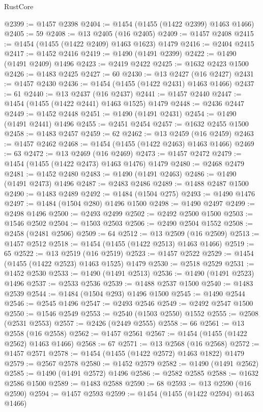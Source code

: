 \begin{lexlean}{RustCore}
\begin{coremodule}
@2399 := @1457 @2398
@2404 := @1454 (@1455 (@1422 @2399) @1463 @1466)
@2405 := 59
@2408 := @13 @2405 (@16 @2405)
@2409 := @1457 @2408
@2415 := @1454 (@1455 (@1422 @2409) @1463 @1623) @1479
@2416 := @2404 @2415
@2417 := @1452 @2416
@2419 := @1490 (@1491 @2399)
@2422 := @1490 (@1491 @2409) @1496
@2423 := @2419 @2422
@2425 := @1632 @2423 @1500
@2426 := @1483 @2425
@2427 := 60
@2430 := @13 @2427 (@16 @2427)
@2431 := @1457 @2430
@2436 := @1454 (@1455 (@1422 @2431) @1463 @1466)
@2437 := 61
@2440 := @13 @2437 (@16 @2437)
@2441 := @1457 @2440
@2447 := @1454 (@1455 (@1422 @2441) @1463 @1525) @1479
@2448 := @2436 @2447
@2449 := @1452 @2448
@2451 := @1490 (@1491 @2431)
@2454 := @1490 (@1491 @2441) @1496
@2455 := @2451 @2454
@2457 := @1632 @2455 @1500
@2458 := @1483 @2457
@2459 := 62
@2462 := @13 @2459 (@16 @2459)
@2463 := @1457 @2462
@2468 := @1454 (@1455 (@1422 @2463) @1463 @1466)
@2469 := 63
@2472 := @13 @2469 (@16 @2469)
@2473 := @1457 @2472
@2479 := @1454 (@1455 (@1422 @2473) @1463 @1476) @1479
@2480 := @2468 @2479
@2481 := @1452 @2480
@2483 := @1490 (@1491 @2463)
@2486 := @1490 (@1491 @2473) @1496
@2487 := @2483 @2486
@2489 := @1488 @2487 @1500
@2490 := @1483 @2489
@2492 := @1484 (@1504 @275)
@2493 := @1490 @1476
@2497 := @1484 (@1504 @280) @1496 @1500
@2498 := @1490 @2497
@2499 := @2498 @1496
@2500 := @2493 @2499
@2502 := @2492 @2500 @1500
@2503 := @1546 @2502
@2504 := @1503 @2503
@2506 := @2490 @2504 @1552
@2508 := @2458 (@2481 @2506)
@2509 := 64
@2512 := @13 @2509 (@16 @2509)
@2513 := @1457 @2512
@2518 := @1454 (@1455 (@1422 @2513) @1463 @1466)
@2519 := 65
@2522 := @13 @2519 (@16 @2519)
@2523 := @1457 @2522
@2529 := @1454 (@1455 (@1422 @2523) @1463 @1525) @1479
@2530 := @2518 @2529
@2531 := @1452 @2530
@2533 := @1490 (@1491 @2513)
@2536 := @1490 (@1491 @2523) @1496
@2537 := @2533 @2536
@2539 := @1488 @2537 @1500
@2540 := @1483 @2539
@2544 := @1484 (@1504 @293) @1496 @1500
@2545 := @1490 @2544
@2546 := @2545 @1496
@2547 := @2493 @2546
@2549 := @2492 @2547 @1500
@2550 := @1546 @2549
@2553 := @2540 (@1503 @2550) @1552
@2555 := @2508 (@2531 @2553)
@2557 := @2426 (@2449 @2555)
@2558 := 66
@2561 := @13 @2558 (@16 @2558)
@2562 := @1457 @2561
@2567 := @1454 (@1455 (@1422 @2562) @1463 @1466)
@2568 := 67
@2571 := @13 @2568 (@16 @2568)
@2572 := @1457 @2571
@2578 := @1454 (@1455 (@1422 @2572) @1463 @1822) @1479
@2579 := @2567 @2578
@2580 := @1452 @2579
@2582 := @1490 (@1491 @2562)
@2585 := @1490 (@1491 @2572) @1496
@2586 := @2582 @2585
@2588 := @1632 @2586 @1500
@2589 := @1483 @2588
@2590 := 68
@2593 := @13 @2590 (@16 @2590)
@2594 := @1457 @2593
@2599 := @1454 (@1455 (@1422 @2594) @1463 @1466)

\end{coremodule}
\end{lexlean}
